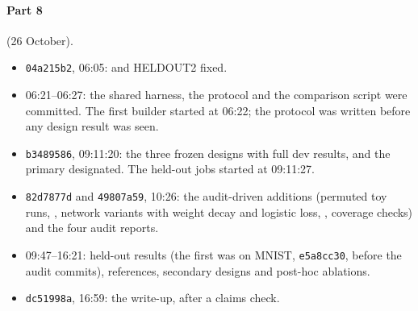 \paragraph{Part 8} (26 October).
\begin{itemize}
\item \texttt{04a215b2}, 06:05:  and HELDOUT2 fixed.
\item 06:21--06:27: the shared harness, the protocol and the comparison script were committed. The first builder started at 06:22; the protocol was written before any design result was seen.
\item \texttt{b3489586}, 09:11:20: the three frozen designs with full dev results, and the primary designated. The held-out jobs started at 09:11:27.
\item \texttt{82d7877d} and \texttt{49807a59}, 10:26: the audit-driven additions (permuted toy runs, , network variants with weight decay and logistic loss, , coverage checks) and the four audit reports.
\item 09:47--16:21: held-out results (the first was  on MNIST, \texttt{e5a8cc30}, before the audit commits), references, secondary designs and post-hoc ablations.
\item \texttt{dc51998a}, 16:59: the write-up, after a claims check.
\end{itemize}

